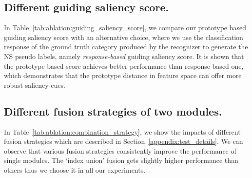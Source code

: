 \documentclass[runningheads]{llncs}
\newcommand{\tabref}[1]{Table~\ref{#1}}
\newcommand{\secref}[1]{Section~\ref{#1}}
\begin{document}
\subsection{Different guiding saliency score.}
In \tabref{tab:ablation:guiding_saliency_score}, we compare our prototype based guiding saliency score with an alternative choice, where we use the classification response of the ground truth category produced by the recognizer to generate the NS pseudo labels, namely \emph{response-based} guiding saliency score. It is shown that the prototype based score achieves better performance than response based one, which demonstrates that the prototype distance in feature space can offer more robust saliency cues.
\begin{table}[h]
\centering
\caption{Performance of different guiding saliency score in FS module.}
\renewcommand{\arraystretch}{1.15}
\label{tab:ablation:guiding_saliency_score}
\end{table} 
\subsection{Different fusion strategies of two modules.}
In \tabref{tab:ablation:combination_strategy}, we show the impacts of different fusion strategies which are described in \secref{appendix:test_details}. We can observe that various fusion strategies consistently improve the performance of single modules. The `index union' fusion gets slightly higher performance than others thus we choose it in all our experiments.

\begin{table}[h]
\centering
\caption{Comparison of various fusion strategies.}
\label{tab:ablation:combination_strategy}
\setlength{\tabcolsep}{4.5pt}
\renewcommand{\arraystretch}{0.9}
\end{table}
\end{document}
